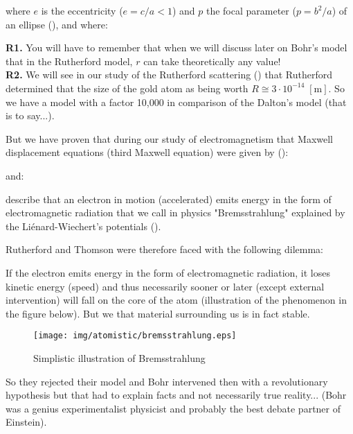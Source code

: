 where $e$ is the eccentricity ($e=c/a<1$) and $p$ the focal parameter ($p=b^2/a$) of an ellipse (), and where:
	

	\begin{tcolorbox}[title=Remark,colframe=black,arc=10pt]
	\textbf{R1.} You will have to remember that when we will discuss later on Bohr's model that in the Rutherford model, $r$ can take theoretically any value!\\

	\textbf{R2.} We will see in our study of the Rutherford scattering () that Rutherford determined that the size of the gold atom as being worth $R\cong 3\cdot 10^{-14}\; [\text{m}]$. So we have a model with a factor 10,000 in comparison of the Dalton's model (that is to say...).
	\end{tcolorbox}	

But we have proven that during our study of electromagnetism that Maxwell displacement equations (third Maxwell equation) were given by ():
	
and:
	
describe that an electron in motion (accelerated) emits energy in the form of electromagnetic radiation that we call in physics "Bremsstrahlung" explained by the Liénard-Wiechert's potentials ().

Rutherford and Thomson were therefore faced with the following dilemma:

If the electron emits energy in the form of electromagnetic radiation, it loses kinetic energy (speed) and thus necessarily sooner or later (except external intervention) will fall on the core of the atom (illustration of the phenomenon in the figure below). But we that material surrounding us is in fact stable.
\begin{figure}[H]
\centering
\texttt{[image: img/atomistic/bremsstrahlung.eps]}
\caption{Simplistic illustration of Bremsstrahlung}
\end{figure}
So they rejected their model and Bohr intervened then with a revolutionary hypothesis but that had to explain facts and not necessarily true reality... (Bohr was a genius experimentalist physicist  and probably the best debate partner of Einstein).


